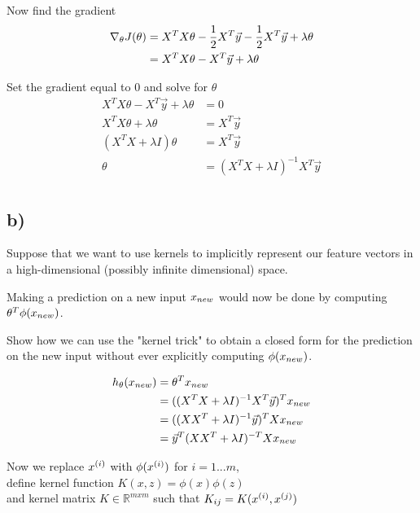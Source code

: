 \documentclass[11pt]{article}
\begin{document}
Now find the gradient
\begin{align*}
  \nabla_{\theta} J(\theta) &= X^{T} X \theta - \frac{1}{2} X^{T} \vec{y} - \frac{1}{2} X^{T} \vec{y} + \lambda \theta \\
  &= X^{T} X \theta - X^{T} \vec{y} + \lambda \theta \\
\end{align*}

Set the gradient equal to $0$ and solve for $\theta$
\begin{align*}
  X^{T} X \theta - X^{T} \vec{y} + \lambda \theta &= 0 \\
  X^{T} X \theta + \lambda \theta &= X^{T} \vec{y} \\
  (X^{T} X + \lambda I) \theta &= X^{T} \vec{y} \\
  \theta &= (X^{T} X + \lambda I)^{-1} X^{T} \vec{y} \\
\end{align*}

\subsection*{b)}

Suppose that we want to use kernels to implicitly represent our feature vectors in a high-dimensional (possibly infinite dimensional) space. 

Making a prediction on a new input $x_{new}$ would now be done by computing $\theta^{T} \phi(x_{new})$.

Show how we can use the "kernel trick" to obtain a closed form for the prediction on the new input without ever explicitly computing $\phi(x_{new})$.

\begin{align*}
  h_{\theta}(x_{new}) &= \theta^{T} x_{new} \\
             &= ((X^{T} X + \lambda I)^{-1} X^{T} \vec{y})^{T} x_{new} \\
             &= ((X X^{T} + \lambda I)^{-1} \vec{y})^{T} X x_{new} \\
             &= \vec{y}^{T} (X X^{T} + \lambda I)^{-T} X x_{new} \\
\end{align*}

Now we replace $x^{(i)}$ with $\phi(x^{(i)})$ for $i = 1...m$,\\
define kernel function $K(x, z) = \phi(x) \phi(z)$ \\
and kernel matrix $K \in \mathbb{R}^{m x m}$ such that $K_{ij} = K(x^{(i)}, x^{(j)})$
\end{document}
